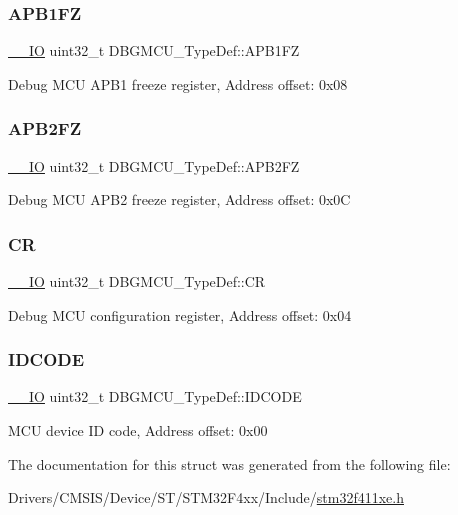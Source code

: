 \subsubsection{\texorpdfstring{A\+P\+B1\+FZ}{APB1FZ}}
{\footnotesize\ttfamily \hyperlink{core__sc300_8h_aec43007d9998a0a0e01faede4133d6be}{\+\_\+\+\_\+\+IO} uint32\+\_\+t D\+B\+G\+M\+C\+U\+\_\+\+Type\+Def\+::\+A\+P\+B1\+FZ}

Debug M\+CU A\+P\+B1 freeze register, Address offset\+: 0x08 \mbox{\label{struct_d_b_g_m_c_u___type_def_a011f892d86367dbe786964b14bc515a6}} 
\subsubsection{\texorpdfstring{A\+P\+B2\+FZ}{APB2FZ}}
{\footnotesize\ttfamily \hyperlink{core__sc300_8h_aec43007d9998a0a0e01faede4133d6be}{\+\_\+\+\_\+\+IO} uint32\+\_\+t D\+B\+G\+M\+C\+U\+\_\+\+Type\+Def\+::\+A\+P\+B2\+FZ}

Debug M\+CU A\+P\+B2 freeze register, Address offset\+: 0x0C \mbox{\label{struct_d_b_g_m_c_u___type_def_a15981828f2b915d38570cf6684e99a53}} 
\subsubsection{\texorpdfstring{CR}{CR}}
{\footnotesize\ttfamily \hyperlink{core__sc300_8h_aec43007d9998a0a0e01faede4133d6be}{\+\_\+\+\_\+\+IO} uint32\+\_\+t D\+B\+G\+M\+C\+U\+\_\+\+Type\+Def\+::\+CR}

Debug M\+CU configuration register, Address offset\+: 0x04 \mbox{\label{struct_d_b_g_m_c_u___type_def_a0cc3561c124d06bb57dfa855e43ed99f}} 
\subsubsection{\texorpdfstring{I\+D\+C\+O\+DE}{IDCODE}}
{\footnotesize\ttfamily \hyperlink{core__sc300_8h_aec43007d9998a0a0e01faede4133d6be}{\+\_\+\+\_\+\+IO} uint32\+\_\+t D\+B\+G\+M\+C\+U\+\_\+\+Type\+Def\+::\+I\+D\+C\+O\+DE}

M\+CU device ID code, Address offset\+: 0x00 

The documentation for this struct was generated from the following file\+:\begin{DoxyCompactItemize}
\item 
Drivers/\+C\+M\+S\+I\+S/\+Device/\+S\+T/\+S\+T\+M32\+F4xx/\+Include/\hyperlink{stm32f411xe_8h}{stm32f411xe.\+h}\end{DoxyCompactItemize}
